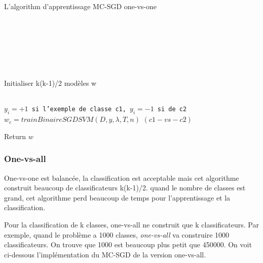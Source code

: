 \makeatletter
\def\BState{\State\hskip-\ALG@thistlm}
\makeatother

\begin{algorithm}[H]
\caption{L'algorithm d'apprentissage MC-SGD one-vs-one}\label{mcsgdal}
\begin{algorithmic}[1]

\\
\\
\\
\\
\\
\\

\State Initialiser k(k-1)/2 modèles w

\\
\State \texttt{$y_i = +1$ si l'exemple de classe c1, $y_i = -1$ si de c2}
\State \texttt{$w_c = trainBinaireSGDSVM(D, y, \lambda, T, n)$} $(c1-vs-c2)$
\EndFor
\EndFor


\State Return $w$

\EndProcedure
\end{algorithmic}
\end{algorithm}


\subsubsection{One-vs-all}
One-vs-one est balancée, la classification est acceptable mais cet algorithme construit beaucoup de classificateurs k(k-1)/2. quand le nombre de classes est grand, cet algorithme perd beaucoup de temps pour l'apprentissage et la classification.

Pour la classification de k classes, one-vs-all ne construit que k classificateurs. Par exemple, quand le problème a 1000 classes, \textit{one-vs-all} va construire 1000 classificateurs. On trouve que 1000 est beaucoup plus petit que 450000. On voit ci-dessous l'implémentation du MC-SGD de la version one-vs-all.

\makeatletter
\def\BState{\State\hskip-\ALG@thistlm}
\makeatother

